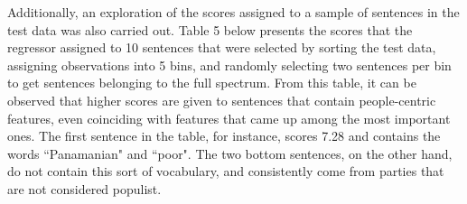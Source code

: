 \documentclass[12pt,letterpaper]{article}
\begin{document}
\noindent Additionally, an exploration of the scores assigned to a sample of sentences in the test data was also carried out. Table 5 below presents the scores that the regressor assigned to 10 sentences that were selected by sorting the test data, assigning observations into 5 bins, and randomly selecting two sentences per bin to get sentences belonging to the full spectrum. From this table, it can be observed that higher scores are given to sentences that contain people-centric features, even coinciding with features that came up among the most important ones. The first sentence in the table, for instance, scores 7.28 and contains the words ``Panamanian" and ``poor". The two bottom sentences, on the other hand, do not contain this sort of vocabulary, and consistently come from parties that are not considered populist. 
\end{document}
